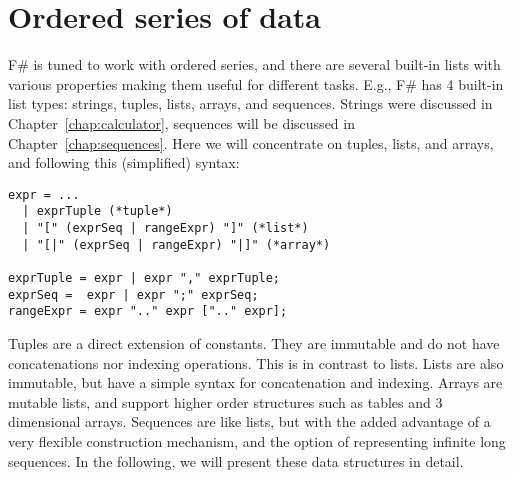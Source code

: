 \chapter{Ordered series of data}
\label{chap:lists}
F\# is tuned to work with ordered series, and there are several built-in lists with various properties making them useful for different tasks. E.g.,
%
%
F\# has 4 built-in list types: strings, tuples, lists, arrays, and sequences. Strings were discussed in Chapter~\ref{chap:calculator}, sequences will be discussed in Chapter~\ref{chap:sequences}. Here we will concentrate on tuples, lists,  and arrays, and following this (simplified) syntax:
%
\begin{lstlisting}[language=ebnf]
expr = ... 
  | exprTuple (*tuple*)
  | "[" (exprSeq | rangeExpr) "]" (*list*)
  | "[|" (exprSeq | rangeExpr) "|]" (*array*)

exprTuple = expr | expr "," exprTuple;
exprSeq =  expr | expr ";" exprSeq;
rangeExpr = expr ".." expr [".." expr];
\end{lstlisting}
%
 Tuples are a direct extension of constants. They are immutable and do not have concatenations nor indexing operations. This is in contrast to lists. Lists are also immutable, but have a simple syntax for concatenation and indexing. Arrays are mutable lists, and support higher order structures such as tables and 3 dimensional arrays. Sequences are like lists, but with the added advantage of a very flexible construction mechanism, and the option of representing infinite long sequences. In the following, we will present these data structures in detail.

